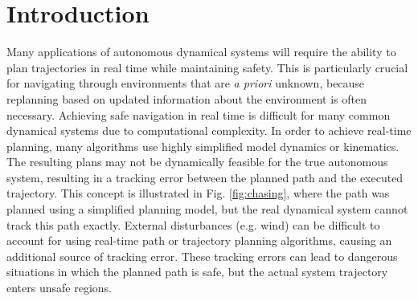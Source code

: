 \section{Introduction}
Many applications of autonomous dynamical systems will require the ability to plan trajectories in real time while maintaining safety.  
This is particularly crucial for navigating through environments that are \textit{a priori} unknown, because replanning based on updated information about the environment is often necessary. 
Achieving safe navigation in real time is difficult for many common dynamical systems due to computational complexity.
 In order to achieve real-time planning, many algorithms use highly simplified model dynamics or kinematics.  The resulting plans may not be dynamically feasible for the true autonomous system, resulting in a tracking error between the planned path and the executed trajectory.
 This concept is illustrated in Fig. \ref{fig:chasing}, where the path was planned using a simplified planning model, but the real dynamical system cannot track this path exactly. 
External disturbances (e.g. wind) can be difficult to account for using real-time path or trajectory planning algorithms, causing an additional source of tracking error. 
These tracking errors can lead to dangerous situations in which the planned path is safe, but the actual system trajectory enters unsafe regions.
 

